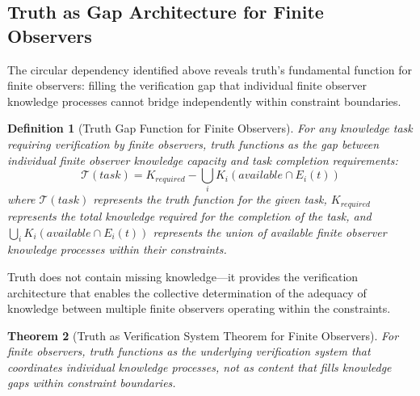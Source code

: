 \documentclass{article}
\newtheorem{theorem}{Theorem}[section]
\newtheorem{definition}[theorem]{Definition}
\begin{document}
\subsection{Truth as Gap Architecture for Finite Observers}

The circular dependency identified above reveals truth's fundamental function for finite observers: filling the verification gap that individual finite observer knowledge processes cannot bridge independently within constraint boundaries.

\begin{definition}[Truth Gap Function for Finite Observers]
For any knowledge task requiring verification by finite observers, truth functions as the gap between individual finite observer knowledge capacity and task completion requirements:
\begin{equation}
\mathcal{T}(task) = K_{required} - \bigcup_{i} K_i(available \cap E_i(t))
\end{equation}
where $\mathcal{T}(task)$ represents the truth function for the given task, $K_{required}$ represents the total knowledge required for the completion of the task, and $\bigcup_{i} K_i(available \cap E_i(t))$ represents the union of available finite observer knowledge processes within their constraints.
\end{definition}

Truth does not contain missing knowledge—it provides the verification architecture that enables the collective determination of the adequacy of knowledge between multiple finite observers operating within the constraints.

\begin{theorem}[Truth as Verification System Theorem for Finite Observers]
For finite observers, truth functions as the underlying verification system that coordinates individual knowledge processes, not as content that fills knowledge gaps within constraint boundaries.
\end{theorem}
\end{document}
